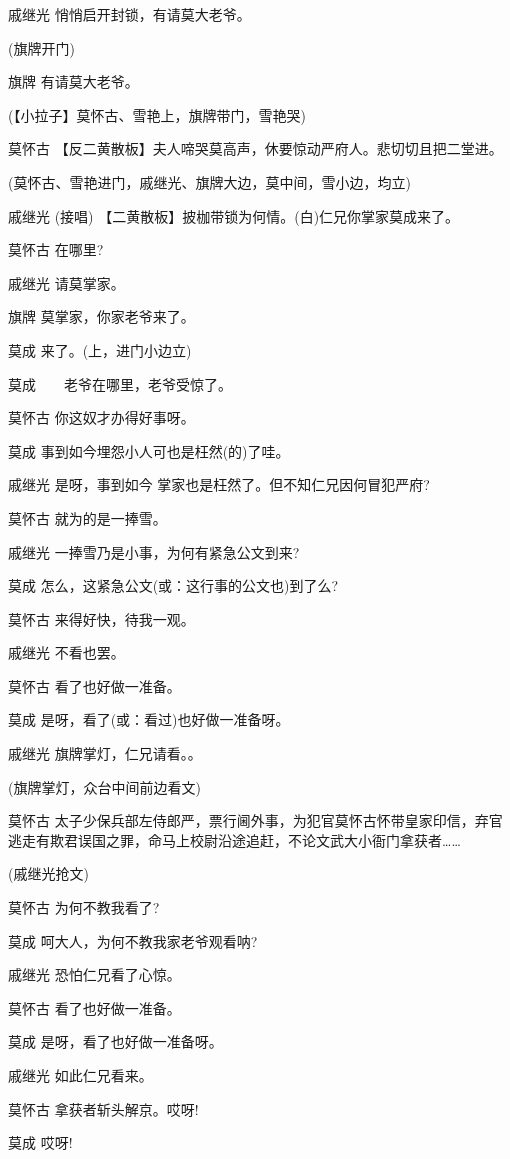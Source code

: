 戚继光 悄悄启开封锁，有请莫大老爷。

(旗牌开门)

旗牌 有请莫大老爷。

(【小拉子】莫怀古、雪艳上，旗牌带门，雪艳哭)

莫怀古 【反二黄散板】夫人啼哭莫高声，休要惊动严府人。悲切切且把二堂进。

(莫怀古、雪艳进门，戚继光、旗牌大边，莫中间，雪小边，均立)

戚继光 (接唱) 【二黄散板】披枷带锁为何情。(白)仁兄你掌家莫成来了。

莫怀古 在哪里?

戚继光 请莫掌家。

旗牌 莫掌家，你家老爷来了。

莫成 来了。(上，进门小边立)

莫成　　老爷在哪里，老爷受惊了。

莫怀古 你这奴才办得好事呀。

莫成 事到如今埋怨小人可也是枉然(的)了哇。

戚继光 是呀，事到如今 掌家也是枉然了。但不知仁兄因何冒犯严府?

莫怀古 就为的是一捧雪。

戚继光 一捧雪乃是小事，为何有紧急公文到来?

莫成 怎么，这紧急公文(或：这行事的公文也)到了么?

莫怀古 来得好快，待我一观。

戚继光 不看也罢。

莫怀古 看了也好做一准备。

莫成 是呀，看了(或：看过)也好做一准备呀。

戚继光 旗牌掌灯，仁兄请看。。

(旗牌掌灯，众台中间前边看文)

莫怀古
太子少保兵部左侍郎严，票行阃外事，为犯官莫怀古怀带皇家印信，弃官逃走有欺君误国之罪，命马上校尉沿途追赶，不论文武大小衙门拿获者\ldots{}\ldots{}

(戚继光抢文)

莫怀古 为何不教我看了?

莫成 呵大人，为何不教我家老爷观看呐?

戚继光 恐怕仁兄看了心惊。

莫怀古 看了也好做一准备。

莫成 是呀，看了也好做一准备呀。

戚继光 如此仁兄看来。

莫怀古 拿获者斩头解京。哎呀!

莫成 哎呀!

